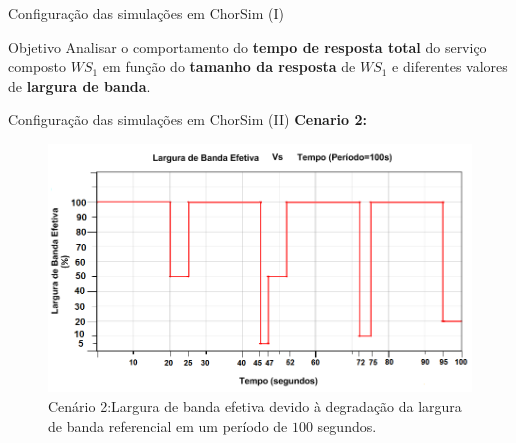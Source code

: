 \documentclass[xcolor=svgnames]{beamer}
\begin{document}
  \begin{frame}{Configuração das simulações em ChorSim (I)}  
      
      \begin{block}{Objetivo} 
      Analisar o comportamento do \textbf{tempo de resposta total} do serviço composto $WS_1$ em função do
      \textbf{tamanho da resposta} de $WS_1$ e diferentes valores de \textbf{largura de banda}.
      \end{block}

      \pause 

    
  \end{frame}

  \begin{frame}{Configuração das simulações em ChorSim (II)}  
	\textbf{Cenario 2:}
  	\begin{figure}[!h]
	    \centering
	    \includegraphics[width=1.0\linewidth]{figures/failure_model.png}
	    \caption{Cenário 2:Largura de banda efetiva devido à degradação da largura de banda referencial em um período de $100$ segundos.}
	    \label{figure:failure_model}
	\end{figure}
  \end{frame}  
\end{document}
